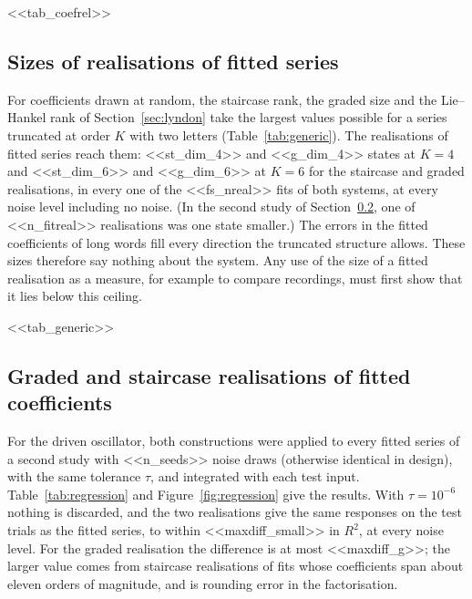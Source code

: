 \documentclass[11pt,a4paper]{article}
\theoremstyle{remark}
\begin{document}
\begin{table}[t]\centering\small
\caption{Errors of the fitted coefficients at $K=6$, on the scale $c_wT^L/L!$, relative to the largest exact coefficient on that scale (largest over the words of each length; median over noise draws).}\label{tab:coefrel}
<<tab_coefrel>>
\end{table}

\subsection{Sizes of realisations of fitted series}
For coefficients drawn at random, the staircase rank, the graded size and the Lie--Hankel rank of Section~\ref{sec:lyndon} take the largest values possible for a series truncated at order $K$ with two letters (Table~\ref{tab:generic}).
The realisations of fitted series reach them: <<st_dim_4>> and <<g_dim_4>> states at $K=4$ and <<st_dim_6>> and <<g_dim_6>> at $K=6$ for the staircase and graded realisations, in every one of the <<fs_nreal>> fits of both systems, at every noise level including no noise.
(In the second study of Section~\ref{sec:regression-fits}, one of <<n_fitreal>> realisations was one state smaller.)
The errors in the fitted coefficients of long words fill every direction the truncated structure allows.
These sizes therefore say nothing about the system.
Any use of the size of a fitted realisation as a measure, for example to compare recordings, must first show that it lies below this ceiling.

\begin{table}[t]\centering\small
\caption{Largest possible sizes for a series truncated at order $K$ with two letters ($c_{()}=0$), found from random coefficients, and the sizes for the exact driven Duffing coefficients.}\label{tab:generic}
<<tab_generic>>
\end{table}

\subsection{Graded and staircase realisations of fitted coefficients}\label{sec:regression-fits}
For the driven oscillator, both constructions were applied to every fitted series of a second study with <<n_seeds>> noise draws (otherwise identical in design), with the same tolerance $\tau$, and integrated with each test input.
Table~\ref{tab:regression} and Figure~\ref{fig:regression} give the results.
With $\tau=10^{-6}$ nothing is discarded, and the two realisations give the same responses on the test trials as the fitted series, to within <<maxdiff_small>> in $R^2$, at every noise level.
For the graded realisation the difference is at most <<maxdiff_g>>; the larger value comes from staircase realisations of fits whose coefficients span about eleven orders of magnitude, and is rounding error in the factorisation.
\end{document}
